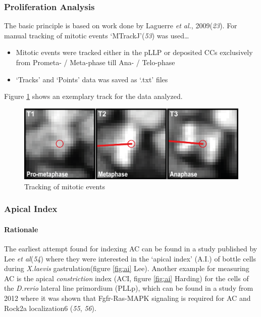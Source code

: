 \documentclass[11pt,singlespacinge,twoside]{reedthesis} %
\providecommand{\tightlist}{%
  \setlength{\itemsep}{0pt}\setlength{\parskip}{0pt}}
\begin{document}
\hypertarget{prolif}{%
\subsubsection{Proliferation Analysis}\label{prolif}}

The basic principle is based on work done by Laguerre \emph{et al.}, 2009(\emph{23}). For manual tracking of mitotic events `MTrackJ'(\emph{53}) was used\ldots{}
\begin{itemize}
\tightlist
\item
  Mitotic events were tracked either in the pLLP or deposited CCs exclusively from Prometa- / Meta-phase till Ana- / Telo-phase
\item
  `Tracks' and `Points' data was saved as `.txt' files
\end{itemize}
\noindent Figure \ref{fig:mitodatapoints} shows an exemplary track for the data analyzed.


\begin{figure}

{\centering \includegraphics[width=0.5\linewidth]{figures/materials/prol/Prolif} 

}

\caption[Tracking of mitotic events]{Tracking of mitotic events}\label{fig:mitodatapoints}
\end{figure}
\hypertarget{ACI}{%
\subsubsection{Apical Index}\label{ACI}}

\hypertarget{rationale}{%
\paragraph{Rationale}\label{rationale}}

The earliest attempt found for indexing AC can be found in a study published by Lee \emph{et al}(\emph{54}) where they were interested in the `apical index' (A.I.) of bottle cells during \emph{X.laevis} gastrulation(figure \ref{fig:ai} Lee). Another example for measuring AC is the apical \emph{constriction} index (ACI, figure \ref{fig:ai} Harding) for the cells of the \emph{D.rerio} lateral line primordium (PLLp), which can be found in a study from 2012 where it was shown that Fgfr-Ras-MAPK signaling is required for AC and Rock2a localization6 (\emph{55}, \emph{56}).
\end{document}
